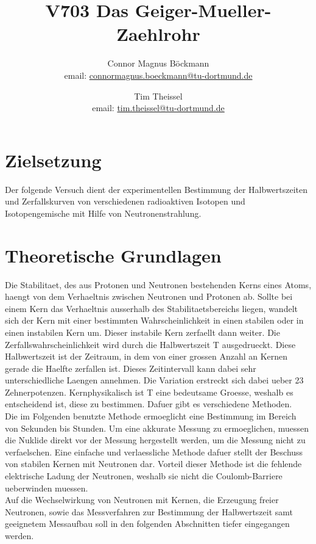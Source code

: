 \documentclass[titlepage=firstcover, captions=tableheading]{scrartcl}
\title{V703 Das Geiger-Mueller-Zaehlrohr}
\author{
Connor Magnus Böckmann \\ email: \href{mailto:connormagnus.boeckmann@tu-dortmund.de}{connormagnus.boeckmann@tu-dortmund.de}
\and Tim Theissel \\ email: \href{mailto:tim.theissel@tu-dortmund.de}{tim.theissel@tu-dortmund.de}}
\begin{document}
\maketitle
\newpage
\tableofcontents
\newpage
\section{Zielsetzung}
Der folgende Versuch dient der experimentellen Bestimmung der Halbwertszeiten und Zerfallskurven von verschiedenen radioaktiven Isotopen und Isotopengemische mit Hilfe von Neutronenstrahlung.
\section{Theoretische Grundlagen}
Die Stabilitaet, des aus Protonen und Neutronen bestehenden Kerns eines Atoms, haengt von dem Verhaeltnis zwischen Neutronen und Protonen ab. Sollte bei einem Kern das Verhaeltnis ausserhalb des Stabilitaetsbereichs liegen, wandelt sich der Kern mit einer bestimmten Wahrscheinlichkeit in einen stabilen oder in einen instabilen Kern um. Dieser instabile Kern zerfaellt dann weiter. Die Zerfallswahrscheinlichkeit wird durch die Halbwertszeit T ausgedrueckt. Diese Halbwertszeit ist der Zeitraum, in dem von einer grossen Anzahl an Kernen gerade die Haelfte zerfallen ist. Dieses Zeitintervall kann dabei sehr unterschiedliche Laengen annehmen. Die Variation erstreckt sich dabei ueber 23 Zehnerpotenzen. Kernphysikalisch ist T eine bedeutsame Groesse, weshalb es entscheidend ist, diese zu bestimmen. Dafuer gibt es verschiedene Methoden.\\
Die im Folgenden benutzte Methode ermoeglicht eine Bestimmung im Bereich von Sekunden bis Stunden. Um eine akkurate Messung zu ermoeglichen, muessen die Nuklide direkt vor der Messung hergestellt werden, um die Messung nicht zu verfaelschen. Eine einfache und verlaessliche Methode dafuer stellt der Beschuss von stabilen Kernen mit Neutronen dar. Vorteil dieser Methode ist die fehlende elektrische Ladung der Neutronen, weshalb sie nicht die Coulomb-Barriere ueberwinden muessen. \\
Auf die Wechselwirkung von Neutronen mit Kernen, die Erzeugung freier Neutronen, sowie das Messverfahren zur Bestimmung der Halbwertszeit samt geeignetem Messaufbau soll in den folgenden Abschnitten tiefer eingegangen werden.
\end{document}
